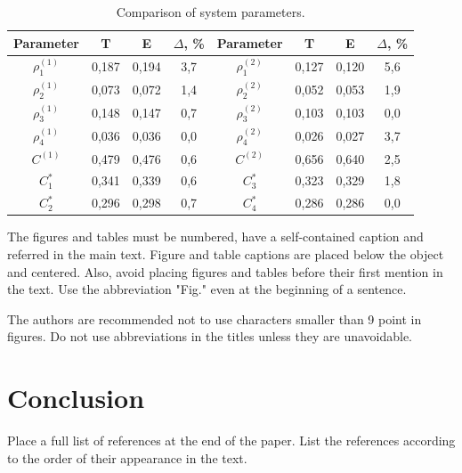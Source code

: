 \documentclass[10pt]{article}
\begin{document}
\begin{table}[h!]\begin{center}
\label{tab}
\begin{tabular}{|c||c|c|c||c||c|c|c|}\hline
  Parameter & T & E & $\Delta$, \% & Parameter & T & E & $\Delta$, \% \\ \hline \hline
  $\rho_{1}^{(1)}$ & 0,187 & 0,194 & 3,7 &  $\rho_{1}^{(2)}$ & 0,127 & 0,120 & 5,6 \\ \hline
  $\rho_{2}^{(1)}$ & 0,073 & 0,072 & 1,4 &  $\rho_{2}^{(2)}$ & 0,052 & 0,053 & 1,9 \\ \hline
  $\rho_{3}^{(1)}$ & 0,148 & 0,147 & 0,7 &  $\rho_{3}^{(2)}$ & 0,103 & 0,103 & 0,0 \\ \hline
  $\rho_{4}^{(1)}$ & 0,036 & 0,036 & 0,0 &  $\rho_{4}^{(2)}$ & 0,026 & 0,027 & 3,7 \\ \hline \hline
  $C^{(1)}$ & 0,479 & 0,476 & 0,6 & $C^{(2)}$ & 0,656 & 0,640 & 2,5 \\ \hline \hline
  $C_{1}^{*}$ & 0,341 & 0,339 & 0,6 & $C_{3}^{*}$ & 0,323 & 0,329 & 1,8 \\ \hline
  $C_{2}^{*}$ & 0,296 & 0,298 & 0,7 & $C_{4}^{*}$ & 0,286 & 0,286 & 0,0 \\ \hline
\end{tabular}\caption{Comparison of system parameters.}
\end{center}\end{table}

The figures and tables must be numbered, have a self-contained
caption and referred in the main text. Figure and table
captions are placed below the object and centered. Also, avoid
placing figures and tables before their first mention in the
text. Use the abbreviation "Fig." even at the beginning of a
sentence.

The authors are recommended not to use characters smaller than
9 point in figures. Do not use abbreviations in the titles
unless they are unavoidable.


\section{Conclusion}

Place a full list of references \cite{Bianchi00, VL02, neuts, GPSS, url} at the end of the paper. List
the references according to the order of their appearance in
the text.

\end{document}
